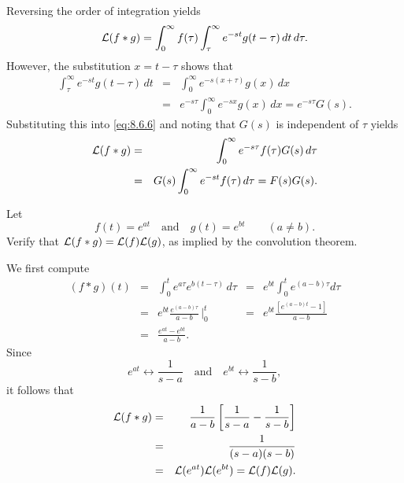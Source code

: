 \documentclass{ximera}
\begin{document}

Reversing the order of integration yields
\begin{equation}\label{eq:8.6.6}
{\cal L}(f\ast g)=\int_0^\infty f(\tau)\int^\infty_\tau e^{-st}g(t-\tau)\,
dt
\,d\tau.
\end{equation}
However, the substitution $x=t-\tau$ shows that
\begin{eqnarray*}
\int^\infty_\tau e^{-st}g(t-\tau)\,dt&=&\int_0^\infty
e^{-s(x+\tau)}g(x)\,dx\\
&=&e^{-s\tau}\int_0^\infty e^{-sx}g(x)\,dx=e^{-s\tau}G(s).
\end{eqnarray*}
Substituting this into  \eqref{eq:8.6.6} and noting that $G(s)$ is
independent of $\tau$ yields
\begin{eqnarray*}
{\cal L}(f\ast g)&=&\int_0^\infty e^{-s\tau} f(\tau)G(s)\,d\tau\\
&=&G(s)\int_0^\infty e^{-st}f(\tau)\,d\tau=F(s)G(s).
\end{eqnarray*}


\begin{example}\label{example:8.6.1}
 Let
$$
f(t)=e^{at}\quad\mbox{and}\quad  g(t)=e^{bt}\qquad (a\ne b).
$$
Verify that ${\cal L}(f\ast g)={\cal L}(f){\cal L}(g)$, as
implied by the convolution theorem.
\begin{explanation}
We first compute
$$
\begin{array}{ccccc}
(f\ast g)(t)&=&\int_0^t e^{a\tau}e^{b(t-\tau)}\,d\tau
&=&e^{bt}\int_0^t e^{(a-b)\tau} d\tau\\
&=&e^{bt} \frac{e^{(a-b)\tau}}{ a-b}\,\bigg|^t_0&=&
e^{bt}\frac{\left[e^{(a-b)t}-1\right]}{a-b}\\
&=&\frac{e^{at}-e^{bt}}{a-b}.
\end{array}
$$
Since
$$
e^{at}\leftrightarrow \frac{1}{s-a}\quad\mbox{and}\quad
e^{bt}\leftrightarrow \frac{1}{s-b},
$$
it follows that
\begin{eqnarray*}
{\cal L}(f\ast g)&=&\frac{1}{a-b}\left[\frac{1}{s-a}-\frac{1}{s-b}\right]\\
&=&\frac{1}{(s-a)(s-b)}\\
&=&{\cal L}(e^{at}){\cal L}(e^{bt})={\cal L}(f){\cal L}(g).
\end{eqnarray*}
\end{explanation}
\end{example}
\end{document}
